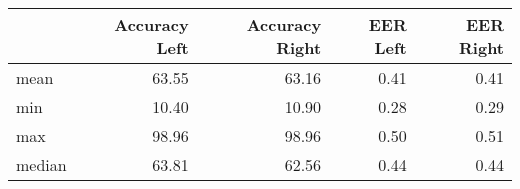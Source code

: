 \begin{tabular}{lrrrr}
\toprule
{} &  Accuracy Left &  Accuracy Right &  EER Left &  EER Right \\
\midrule
mean   &          63.55 &           63.16 &      0.41 &       0.41 \\
min    &          10.40 &           10.90 &      0.28 &       0.29 \\
max    &          98.96 &           98.96 &      0.50 &       0.51 \\
median &          63.81 &           62.56 &      0.44 &       0.44 \\
\bottomrule
\end{tabular}
